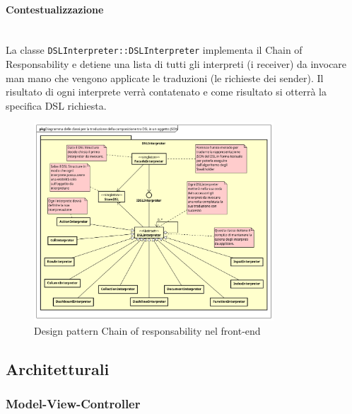 \paragraph{Contestualizzazione}\mbox{} \\
La classe \texttt{DSLInterpreter::DSLInterpreter} implementa il Chain of Responsability e detiene una lista di tutti gli interpreti (i receiver) da invocare man mano che vengono applicate le traduzioni (le richieste dei sender). Il risultato di ogni interprete verrà contatenato e come risultato si otterrà la specifica DSL richiesta.
\begin{figure}[H]
\centering
\includegraphics[width=0.8\textwidth]{res/sections/frontend/chainOfResponsability.png}
\caption{Design pattern Chain of responsability nel front-end}
\end{figure}
\subsection{Architetturali}
\subsubsection{Model-View-Controller}
